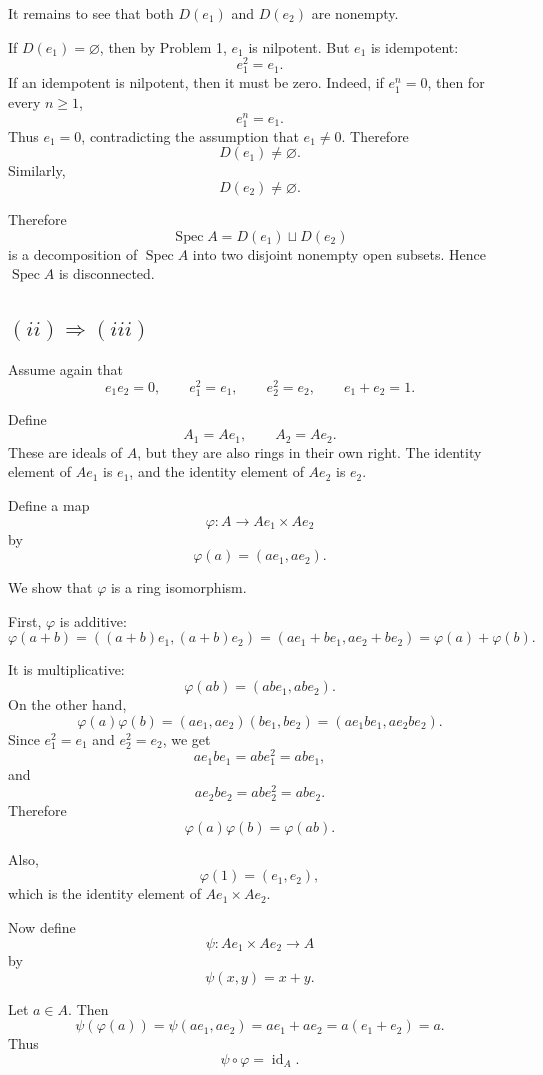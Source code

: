 \documentclass[12pt,a4paper]{article}
\newcommand{\Spec}{\operatorname{Spec}}
\begin{document}
	It remains to see that both \(D(e_1)\) and \(D(e_2)\) are nonempty.
	
	If \(D(e_1)=\varnothing\), then by Problem 1, \(e_1\) is nilpotent. But \(e_1\)
	is idempotent:
	\[
	e_1^2=e_1.
	\]
	If an idempotent is nilpotent, then it must be zero. Indeed, if \(e_1^n=0\), then
	for every \(n\geq 1\),
	\[
	e_1^n=e_1.
	\]
	Thus \(e_1=0\), contradicting the assumption that \(e_1\neq 0\). Therefore
	\[
	D(e_1)\neq \varnothing.
	\]
	Similarly,
	\[
	D(e_2)\neq \varnothing.
	\]
	
	Therefore
	\[
	\Spec A=D(e_1)\sqcup D(e_2)
	\]
	is a decomposition of \(\Spec A\) into two disjoint nonempty open subsets. Hence
	\(\Spec A\) is disconnected.
	
	\subsection*{\((ii)\Rightarrow(iii)\)}
	
	Assume again that
	\[
	e_1e_2=0,
	\qquad
	e_1^2=e_1,
	\qquad
	e_2^2=e_2,
	\qquad
	e_1+e_2=1.
	\]
	
	Define
	\[
	A_1=Ae_1,
	\qquad
	A_2=Ae_2.
	\]
	These are ideals of \(A\), but they are also rings in their own right. The
	identity element of \(Ae_1\) is \(e_1\), and the identity element of \(Ae_2\) is
	\(e_2\).
	
	Define a map
	\[
	\varphi:A\longrightarrow Ae_1\times Ae_2
	\]
	by
	\[
	\varphi(a)=(ae_1,ae_2).
	\]
	
	We show that \(\varphi\) is a ring isomorphism.
	
	First, \(\varphi\) is additive:
	\[
	\varphi(a+b)=((a+b)e_1,(a+b)e_2)
	=(ae_1+be_1,ae_2+be_2)
	=\varphi(a)+\varphi(b).
	\]
	
	It is multiplicative:
	\[
	\varphi(ab)=(abe_1,abe_2).
	\]
	On the other hand,
	\[
	\varphi(a)\varphi(b)
	=
	(ae_1,ae_2)(be_1,be_2)
	=
	(ae_1be_1,ae_2be_2).
	\]
	Since \(e_1^2=e_1\) and \(e_2^2=e_2\), we get
	\[
	ae_1be_1=ab e_1^2=ab e_1,
	\]
	and
	\[
	ae_2be_2=ab e_2^2=ab e_2.
	\]
	Therefore
	\[
	\varphi(a)\varphi(b)=\varphi(ab).
	\]
	
	Also,
	\[
	\varphi(1)=(e_1,e_2),
	\]
	which is the identity element of \(Ae_1\times Ae_2\).
	
	Now define
	\[
	\psi:Ae_1\times Ae_2\longrightarrow A
	\]
	by
	\[
	\psi(x,y)=x+y.
	\]
	
	Let \(a\in A\). Then
	\[
	\psi(\varphi(a))
	=
	\psi(ae_1,ae_2)
	=
	ae_1+ae_2
	=
	a(e_1+e_2)
	=
	a.
	\]
	Thus
	\[
	\psi\circ\varphi=\operatorname{id}_A.
	\]
	
\end{document}
